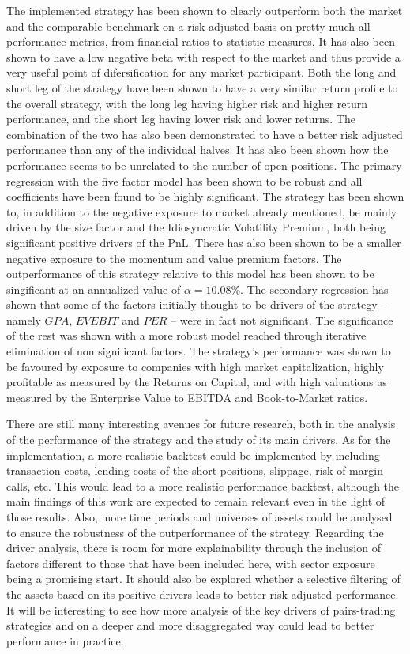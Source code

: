 The implemented strategy has been shown to clearly outperform both the market and the comparable benchmark on a risk adjusted basis on pretty much all performance metrics, from financial ratios to statistic measures. It has also been shown to have a low negative beta with respect to the market and thus provide a very useful point of difersification for any market participant. Both the long and short leg of the strategy have been shown to have a very similar return profile to the overall strategy, with the long leg having higher risk and higher return performance, and the short leg having lower risk and lower returns. The combination of the two has also been demonstrated to have a better risk adjusted performance than any of the individual halves. It has also been shown how the performance seems to be unrelated to the number of open positions. 
The primary regression with the five factor model has been shown to be robust and all coefficients have been found to be highly significant. The strategy has been shown to, in addition to the negative exposure to market already mentioned, be mainly driven by the size factor and the Idiosyncratic Volatility Premium, both being significant positive drivers of the PnL. There has also been shown to be a smaller negative exposure to the momentum and value premium factors. The outperformance of this strategy relative to this model has been shown to be singificant at an annualized value of $\alpha=10.08\%$. 
The secondary regression has shown that some of the factors initially thought to be drivers of the strategy -- namely $GPA$, $EVEBIT$ and $PER$ -- were in fact not significant. The significance of the rest was shown with a more robust model reached through iterative elimination of non significant factors. The strategy's performance was shown to be favoured by exposure to companies with high market capitalization, highly profitable as measured by the Returns on Capital, and with high valuations as measured by the Enterprise Value to EBITDA and Book-to-Market ratios. 

There are still many interesting avenues for future research, both in the analysis of the performance of the strategy and the study of its main drivers. 
As for the implementation, a more realistic backtest could be implemented by including transaction costs, lending costs of the short positions, slippage, risk of margin calls, etc. This would lead to a more realistic performance backtest, although the main findings of this work are expected to remain relevant even in the light of those results. Also, more time periods and universes of assets could be analysed to ensure the robustness of the outperformance of the strategy.
Regarding the driver analysis, there is room for more explainability through the inclusion of factors different to those that have been included here, with sector exposure being a promising start. It should also be explored whether a selective filtering of the assets based on its positive drivers leads to better risk adjusted performance. It will be interesting to see how more analysis of the key drivers of pairs-trading strategies and on a deeper and more disaggregated way could lead to better performance in practice.